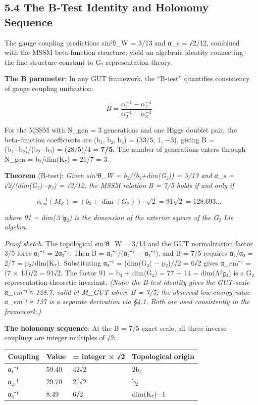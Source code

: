 \documentclass[11pt,a4paper]{article}
\begin{document}
\subsection{5.4 The B-Test Identity and Holonomy Sequence}\label{the-b-test-identity-and-holonomy-sequence}

The gauge coupling predictions sin²θ\_\allowbreak{}W = 3/13 and α\_\allowbreak{}s = √2/12, combined with the MSSM beta-function structure, yield an algebraic identity connecting the fine structure constant to G₂ representation theory.

\textbf{The B parameter}: In any GUT framework, the ``B-test'' quantifies consistency of gauge coupling unification:

\[B = \frac{\alpha_1^{-1} - \alpha_2^{-1}}{\alpha_2^{-1} - \alpha_3^{-1}}\]

For the MSSM with N\_\allowbreak{}gen = 3 generations and one Higgs doublet pair, the beta-function coefficients are (b₁, b₂, b₃) = (33/5, 1, −3), giving B = (b₁−b₂)/(b₂−b₃) = (28/5)/4 = \textbf{7/5}. The number of generations enters through N\_\allowbreak{}gen = b₂/dim(K₇) = 21/7 = 3.

\textbf{Theorem} (B-test): \emph{Given sin²θ\_\allowbreak{}W = b₂/(b₃+dim(G₂)) = 3/13 and α\_\allowbreak{}s = √2/(dim(G₂)−p₂) = √2/12, the MSSM relation B = 7/5 holds if and only if}

\[\alpha_{\mathrm{em}}^{-1}(M_Z) = (b_3 + \dim(G_2)) \cdot \sqrt{2} = 91\sqrt{2} = 128.693\ldots\]

\emph{where 91 = dim(Λ²\ensuremath{\mathfrak{g}}₂) is the dimension of the exterior square of the G₂ Lie algebra.}

\emph{Proof sketch}. The topological sin²θ\_\allowbreak{}W = 3/13 and the GUT normalization factor 3/5 force α₁⁻¹ = 2α₂⁻¹. Then B = α₂⁻¹/(α₂⁻¹ − α₃⁻¹), and B = 7/5 requires α₂/α₃ = 2/7 = p₂/dim(K₇). Substituting α₃⁻¹ = (dim(G₂) − p₂)/√2 = 6√2 gives α\_\allowbreak{}em⁻¹ = (7 × 13)√2 = 91√2. The factor 91 = b₃ + dim(G₂) = 77 + 14 = dim(Λ²\ensuremath{\mathfrak{g}}₂) is a G₂ representation-theoretic invariant. \emph{(Note: the B-test identity gives the GUT-scale α\_\allowbreak{}em⁻¹ ≈ 128.7, valid at M\_\allowbreak{}GUT where B = 7/5; the observed low-energy value α\_\allowbreak{}em⁻¹ ≈ 137 is a separate derivation via §4.1. Both are used consistently in the framework.)}

\textbf{The holonomy sequence}: At the B = 7/5 exact scale, all three inverse couplings are integer multiples of √2:

\begin{longtable}[]{@{}llll@{}}
\toprule\noalign{}
Coupling & Value & = integer × √2 & Topological origin \\
\midrule\noalign{}
\endhead
\bottomrule\noalign{}
\endlastfoot
α₁⁻¹ & 59.40 & 42√2 & 2b₂ \\
α₂⁻¹ & 29.70 & 21√2 & b₂ \\
α₃⁻¹ & 8.49 & 6√2 & dim(K₇)−1 \\
\end{longtable}
\end{document}
